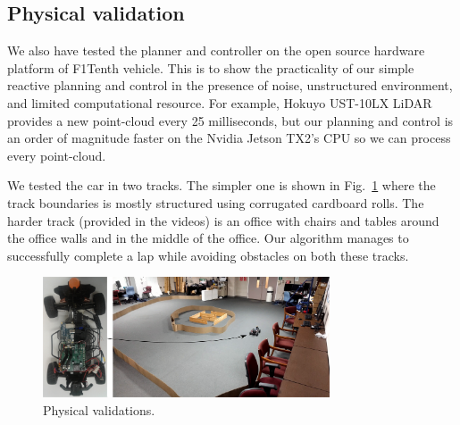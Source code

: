 \subsection{Physical validation}
We also have tested the planner and controller on the open source hardware platform of F1Tenth vehicle.
This is to show the practicality of our simple reactive planning and control in the presence of noise, unstructured environment, and limited computational resource.
For example, Hokuyo UST-10LX LiDAR provides a new point-cloud every 25 milliseconds, but our planning and control is an order of magnitude faster on the Nvidia Jetson TX2's CPU so we can process every point-cloud.

We tested the car in two tracks.
The simpler one is shown in Fig.~\ref{fig:physical_track} where the track boundaries is mostly structured using corrugated cardboard rolls.
%
The harder track (provided in the videos) is an office with chairs and tables around the office walls and in the middle of the office.
%
Our algorithm manages to successfully complete a lap while avoiding obstacles on both these tracks.

\begin{figure}[!t]
\centering
\includegraphics[width=85mm]{Figures/physical_track.png}
\caption{Physical validations.}
\label{fig:physical_track}
\end{figure}




